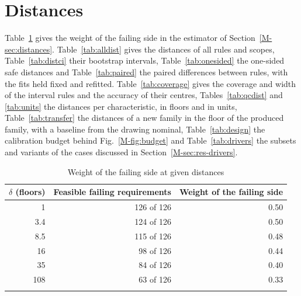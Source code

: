 \documentclass[pdflatex,sn-basic]{sn-jnl}
\newcommand{\tabsize}{\fontsize{8}{9.5}\selectfont}
\begin{document}
\FloatBarrier
\section{Distances}\label{sec:s-distances}

Table~\ref{tab:weights} gives the weight of the failing side in the estimator of Section~\ref{M-sec:distances}. Table~\ref{tab:alldist} gives the distances of all rules and scopes, Table~\ref{tab:distci} their bootstrap intervals, Table~\ref{tab:onesided} the one-sided safe distances and Table~\ref{tab:paired} the paired differences between rules, with the fits held fixed and refitted. Table~\ref{tab:coverage} gives the coverage and width of the interval rules and the accuracy of their centres, Tables~\ref{tab:qcdist} and \ref{tab:units} the distances per characteristic, in floors and in units, Table~\ref{tab:transfer} the distances of a new family in the floor of the produced family, with a baseline from the drawing nominal, Table~\ref{tab:design} the calibration budget behind Fig.~\ref{M-fig:budget} and Table~\ref{tab:drivers} the subsets and variants of the cases discussed in Section~\ref{M-sec:res-drivers}.

\begin{table}[tbp]
\tabsize
\setlength{\tabcolsep}{8pt}
\caption{Weight of the failing side at given distances}\label{tab:weights}
\begin{tabular}{@{}rrr@{}}
\toprule
$\delta$ (floors) & Feasible failing requirements & Weight of the failing side \\
\midrule
1 & 126 of 126 & 0.50 \\
3.4 & 124 of 126 & 0.50 \\
8.5 & 115 of 126 & 0.48 \\
16 & 98 of 126 & 0.44 \\
35 & 84 of 126 & 0.40 \\
108 & 63 of 126 & 0.33 \\
\botrule
\end{tabular}
\end{table}
\end{document}
